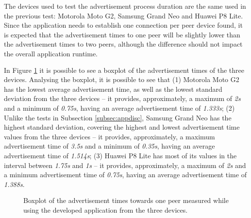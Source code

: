 The devices used to test the advertisement process duration are the same used in the previous test: Motorola Moto G2, Samsung Grand Neo and Huawei P8 Lite. Since the application needs to establish one connection per peer device found, it is expected that the advertisement times to one peer will be slightly lower than the advertisement times to two peers, although the difference should not impact the overall application runtime.

In Figure \ref{fig:adv1} it is possible to see a boxplot of the advertisement times of the three devices. Analysing the boxplot, it is possible to see that (1) Motorola Moto G2 has the lowest average advertisement time, as well as the lowest standard deviation from the three devices -- it provides, approximately, a maximum of \textit{2s} and a minimum of \textit{0.75s}, having an average advertisement time of \textit{1.333s}; (2) Unlike the tests in Subsection \ref{subsec:appdisc}, Samsung Grand Neo has the highest standard deviation, covering the highest and lowest advertisement time values from the three devices -- it provides, approximately, a maximum advertisement time of \textit{3.5s} and a minimum of \textit{0.35s}, having an average advertisement time of \textit{1.514s}; (3) Huawei P8 Lite has most of its values in the interval between \textit{1.75s} and \textit{1s} -- it provides, approximately, a maximum of \textit{2s} and a minimum advertisement time of \textit{0.75s}, having an average advertisement time of \textit{1.388s}.

\begin{figure}[ht]
	\noindent{}
	\caption{\label{fig:adv1} Boxplot of the advertisement times towards one peer measured while using the developed application from the three devices.}
\end{figure}

